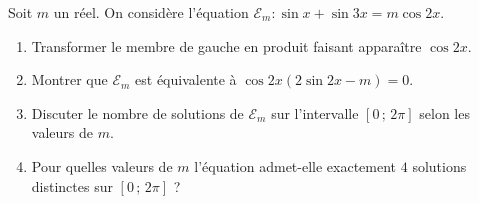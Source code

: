 \documentclass[11pt]{article}
\begin{document}
\begin{exercice}
Soit $m$ un réel. On considère l'équation $\mathcal{E}_m : \sin x + \sin 3x = m \cos 2x$.
\begin{enumerate}
    \item Transformer le membre de gauche en produit faisant apparaître $\cos 2x$.
    \item Montrer que $\mathcal{E}_m$ est équivalente à $\cos 2x (2\sin 2x - m) = 0$.
    \item Discuter le nombre de solutions de $\mathcal{E}_m$ sur l'intervalle $[0\,;\, 2\pi]$ selon les valeurs de $m$.
    \item Pour quelles valeurs de $m$ l'équation admet-elle exactement $4$ solutions distinctes sur $[0\,;\, 2\pi]$ ?
\end{enumerate}
\end{exercice}
\end{document}
